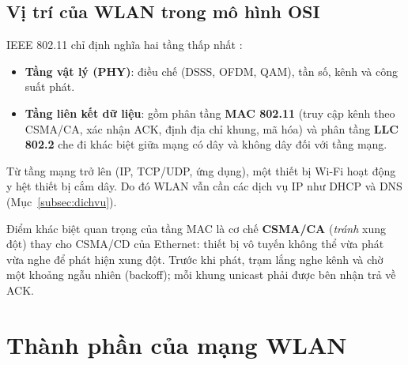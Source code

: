 \documentclass[12pt,a4paper]{article}
\numberwithin{figure}{section}
\numberwithin{table}{section}
\begin{document}
\subsection{Vị trí của WLAN trong mô hình OSI}
IEEE 802.11 chỉ định nghĩa hai tầng thấp nhất \cite{kurose2012}:
\begin{itemize}
  \item \textbf{Tầng vật lý (PHY)}: điều chế (DSSS, OFDM, QAM), tần số, kênh
    và công suất phát.
  \item \textbf{Tầng liên kết dữ liệu}: gồm phân tầng \textbf{MAC 802.11}
    (truy cập kênh theo CSMA/CA, xác nhận ACK, định địa chỉ khung, mã hóa) và
    phân tầng \textbf{LLC 802.2} che đi khác biệt giữa mạng có dây và không
    dây đối với tầng mạng.
\end{itemize}
Từ tầng mạng trở lên (IP, TCP/UDP, ứng dụng), một thiết bị Wi-Fi hoạt động y
hệt thiết bị cắm dây. Do đó WLAN vẫn cần các dịch vụ IP như DHCP và DNS
(Mục~\ref{subsec:dichvu}).

Điểm khác biệt quan trọng của tầng MAC là cơ chế \textbf{CSMA/CA}
(\emph{tránh} xung đột) thay cho CSMA/CD của Ethernet: thiết bị vô tuyến không
thể vừa phát vừa nghe để phát hiện xung đột. Trước khi phát, trạm lắng nghe
kênh và chờ một khoảng ngẫu nhiên (backoff); mỗi khung unicast phải được bên
nhận trả về ACK.

\section{Thành phần của mạng WLAN}
\label{sec:thanhphan}
\end{document}
